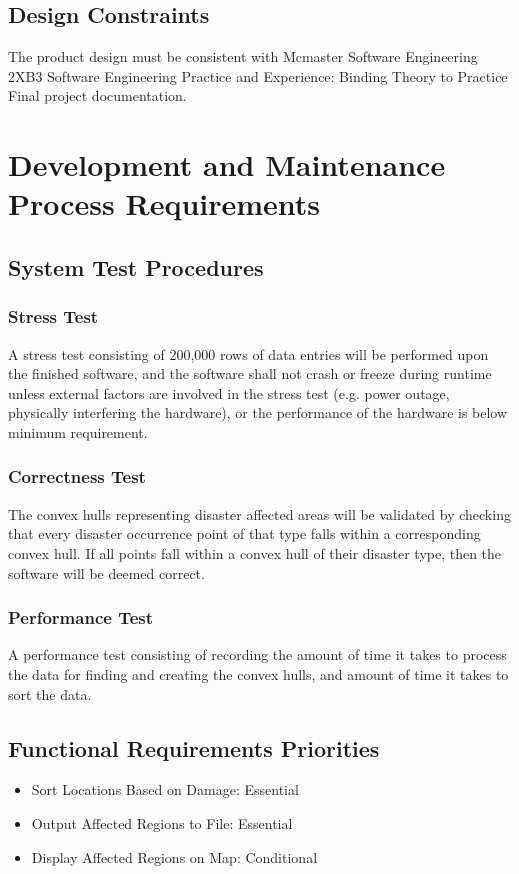 \documentclass{article}
\begin{document}
\subsection{Design Constraints}
The product design must be consistent with Mcmaster Software Engineering
2XB3 Software Engineering Practice and Experience: Binding Theory to Practice
Final project documentation.

\section{Development and Maintenance Process Requirements}
\subsection{System Test Procedures}
\subsubsection{Stress Test}
A stress test consisting of 200,000 rows of data entries will be
performed upon the finished software, and the software shall not crash
or freeze during runtime unless external factors are involved in the
stress test (e.g. power outage, physically interfering the hardware),
or the performance of the hardware is below minimum requirement.

\subsubsection{Correctness Test}
The convex hulls representing disaster affected areas will be validated
by checking that every disaster occurrence point of that type falls within a
corresponding convex hull. If all points fall within a convex hull of their
disaster type, then the software will be deemed correct.

\subsubsection {Performance Test}
A performance test consisting of recording the amount of time it takes to
process the data for finding and creating the convex hulls, and amount of
time it takes to sort the data.
\subsection{Functional Requirements Priorities}
\begin{itemize}
    \item Sort Locations Based on Damage: Essential
    \item Output Affected Regions to File: Essential
    \item Display Affected Regions on Map: Conditional
\end{itemize}
\end{document}

